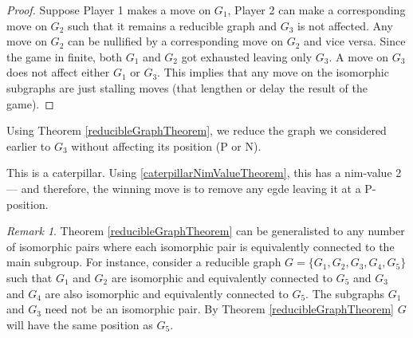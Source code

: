\documentclass[a4paper, 12pt]{article}
\theoremstyle{remark} %
\newtheorem*{remark}{Remark}
\begin{document}
\begin{proof}
	Suppose Player 1 makes a move on $G_1$, Player 2 can make a corresponding move on $G_2$ such that it remains a reducible graph and $G_3$ is not affected. Any move on $G_2$ can be nullified by a corresponding move on $G_2$ and vice versa. Since the game in finite, both $G_1$ and $G_2$ got exhausted leaving only $G_3$. A move on $G_3$ does not affect either $G_1$ or $G_3$. This implies that any move on the isomorphic subgraphs are just stalling moves (that lengthen or delay the result of the game).
\end{proof}

Using Theorem \ref{reducibleGraphTheorem}, we reduce the graph we considered earlier to $G_3$ without affecting its position (P or N).

\begin{center}
\end{center}

This is a caterpillar. Using \ref{caterpillarNimValueTheorem}, this has a nim-value 2 --- and therefore, the winning move is to remove any egde leaving it at a P-position.

\begin{remark}
	Theorem \ref{reducibleGraphTheorem} can be generalisted to any number of isomorphic pairs where each isomorphic pair is equivalently connected to the main subgroup. For instance, consider a reducible graph $G=\{G_1,G_2,G_3,G_4,G_5\}$ such that $G_1$ and $G_2$ are isomorphic and equivalently connected to $G_5$ and $G_3$ and $G_4$ are also isomorphic and equivalently connected to $G_5$. The subgraphs $G_1$ and $G_3$ need not be an isomorphic pair. By Theorem \ref{reducibleGraphTheorem} $G$ will have the same position as $G_5$.
\end{remark}
\end{document}

